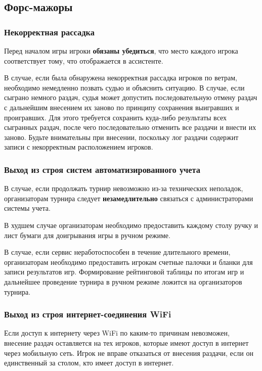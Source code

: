 \subsection{Форс-мажоры}

\subsubsection{Некорректная рассадка}

Перед началом игры игроки \textbf{обязаны убедиться}, что место каждого игрока соответствует тому, что отображается в ассистенте.

В случае, если была обнаружена некорректная рассадка игроков по ветрам, необходимо немедленно позвать судью и объяснить ситуацию. В случае, если сыграно немного раздач, судья может допустить последовательную отмену раздач с дальнейшим внесением их заново по принципу сохранения выигравших и проигравших. Для этого требуется сохранить куда-либо результаты всех сыгранных раздач, после чего последовательно отменить все раздачи и внести их заново. Будьте внимательны при внесении, поскольку лог раздачи содержит записи с некорректным расположением игроков.

\subsubsection{Выход из строя систем автоматизированного учета}

В случае, если продолжать турнир невозможно из-за технических неполадок, организаторам турнира следует \textbf{незамедлительно} связаться с администраторами системы учета. 

В худшем случае организаторам необходимо предоставить каждому столу ручку и лист бумаги для доигрывания игры в ручном режиме.

В случае, если сервис неработоспособен в течение длительного времени, организаторам необходимо предоставить игрокам счетные палочки и бланки для записи результатов игр. Формирование рейтинговой таблицы по итогам игр и дальнейшее проведение турнира в ручном режиме ложится на организаторов турнира.

\subsubsection{Выход из строя интернет-соединения WiFi}

Если доступ к интернету через WiFi по каким-то причинам невозможен, внесение раздач оставляется на тех игроков, которые имеют доступ в интернет через мобильную сеть. Игрок не вправе отказаться от внесения раздачи, если он единственный за столом, кто имеет доступ в интернет.

